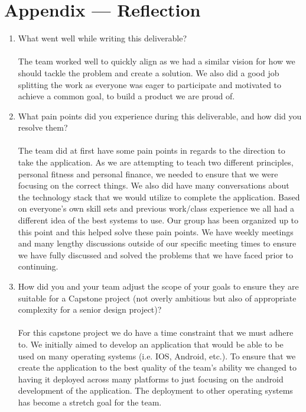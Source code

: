 \documentclass{article}
\begin{document}
\newpage{}

\section*{Appendix --- Reflection}




\begin{enumerate}
    \item What went well while writing this deliverable? 
    \\\\The team worked well to quickly align as we had a similar vision for how we should tackle the problem and create a solution. We also did a good job splitting the work as everyone was eager to participate and motivated to achieve a common goal, to build a product we are proud of. 
    \item What pain points did you experience during this deliverable, and how
    did you resolve them?
    \\\\The team did at first have some pain points in regards to the direction to take the application. As we are attempting to teach two different principles, personal fitness and personal finance, we needed to ensure that we were focusing on the correct things. 
    We also did have many conversations about the technology stack that we would utilize to complete the application. 
    Based on everyone's own skill sets and previous work/class experience we all had a different idea of the best systems to use. 
    Our group has been organized up to this point and this helped solve these pain points. We have weekly meetings and many lengthy discussions outside of our specific meeting times to ensure we have fully discussed and solved the problems that we have faced prior to continuing.
    \item How did you and your team adjust the scope of your goals to ensure
    they are suitable for a Capstone project (not overly ambitious but also of
    appropriate complexity for a senior design project)?
    \\\\For this capstone project we do have a time constraint that we must adhere to. We initially aimed to develop an application that would be able to be used on many operating systems (i.e. IOS, Android, etc.). 
    To ensure that we create the application to the best quality of the team’s ability we changed to having it deployed across many platforms to just focusing on the android development of the application. 
    The deployment to other operating systems has become a stretch goal for the team.
\end{enumerate}  
\end{document}
